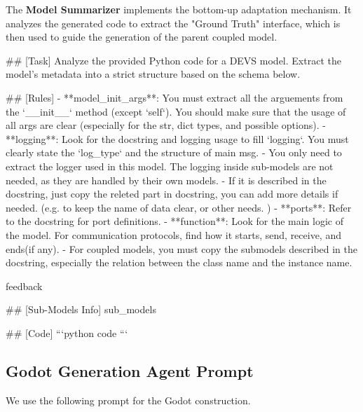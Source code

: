 The \textbf{Model Summarizer} implements the bottom-up adaptation mechanism. It analyzes the generated code to extract the "Ground Truth" interface, which is then used to guide the generation of the parent coupled model.

\begin{promptbox}
## [Task]
Analyze the provided Python code for a DEVS model.
Extract the model's metadata into a strict structure based on the schema below. 

## [Rules]
- **model_init_args**: You must extract all the arguements from the `__init__` method (except `self`). You should make sure that the usage of all args are clear (especially for the str, dict types, and possible options).
- **logging**: Look for the docstring and logging usage to fill `logging`. You must clearly state the `log_type` and the structure of main msg. 
  - You only need to extract the logger used in this model. The logging inside sub-models are not needed, as they are handled by their own models.
  - If it is described in the docstring, just copy the releted part in docstring, you can add more details if needed. (e.g. to keep the name of data clear, or other needs. )
- **ports**: Refer to the docstring for port definitions. 
- **function**: Look for the main logic of the model. For communication protocols, find how it starts, send, receive, and ends(if any). 
  - For coupled models, you must copy the submodels described in the docstring, especially the relation between the class name and the instance name.

{feedback}

## [Sub-Models Info]
{sub_models}

## [Code]
```python
{code}
```
\end{promptbox}

\subsection{Godot Generation Agent Prompt}

We use the following prompt for the Godot construction. 

